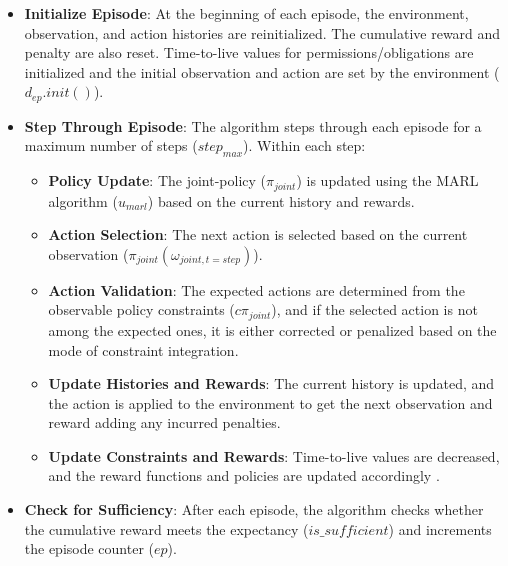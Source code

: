 \documentclass[conference]{IEEEtran}
\begin{document}
\begin{itemize}
    \item \textbf{Initialize Episode}:
          At the beginning of each episode, the environment, observation, and action histories are reinitialized. The cumulative reward and penalty are also reset. Time-to-live values for permissions/obligations are initialized and the initial observation and action are set by the environment ($d_{ep}.init()$).

    \item \textbf{Step Through Episode}:
          The algorithm steps through each episode for a maximum number of steps ($step_{max}$). Within each step:

          \begin{itemize}
              \item \textbf{Policy Update}:
                    The joint-policy ($\pi_{joint}$) is updated using the MARL algorithm ($u_{marl}$) based on the current history and rewards.

              \item \textbf{Action Selection}:
                    The next action is selected based on the current observation ($\pi_{joint}(\omega_{joint,t=step})$).

              \item \textbf{Action Validation}:
                    The expected actions are determined from the observable policy constraints ($c\pi_{joint}$), and if the selected action is not among the expected ones, it is either corrected or penalized based on the mode of constraint integration.

              \item \textbf{Update Histories and Rewards}:
                    The current history is updated, and the action is applied to the environment to get the next observation and reward adding any incurred penalties.

              \item \textbf{Update Constraints and Rewards}:
                    Time-to-live values are decreased, and the reward functions and policies are updated accordingly .
          \end{itemize}

    \item \textbf{Check for Sufficiency}:
          After each episode, the algorithm checks whether the cumulative reward meets the expectancy ($is\_sufficient$) and increments the episode counter ($ep$).
\end{itemize}
\end{document}
